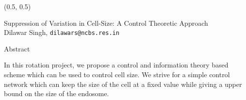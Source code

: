 \documentclass{beamer}
\begin{document}
\begin{textblock}{15}(0.5, 0.5)
    \begin{block}{}
        \centering
        \Large Suppression of Variation in Cell-Size: A Control Theoretic Approach \\
        \large Dilawar Singh, \texttt{dilawars@ncbs.res.in}
    \end{block}
    \begin{block}{Abstract}

        In this rotation project, we propose a control and information theory
        based scheme which can be used to control cell size. We strive for a
        simple control network which can keep the size of the cell at a fixed
        value while giving a upper bound on the size of the endosome.

    \end{block}

\end{textblock}
\end{document}
